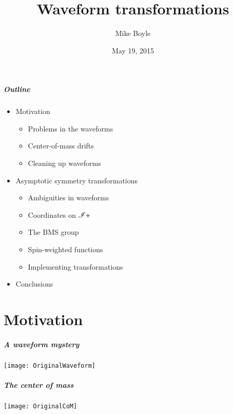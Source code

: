 \documentclass[12pt,xcolor={dvipsnames}]{beamer}
\title{Waveform transformations}
\author[Mike Boyle] {Mike Boyle}
\date{May 19, 2015}
\begin{document}
\begin{frame}[plain]
  \titlepage
\end{frame}



\begin{frame}
  \frametitle{Outline}
  \begin{itemize}
  \item Motivation
    \begin{itemize}
    \item Problems in the waveforms
    \item Center-of-mass drifts
    \item Cleaning up waveforms
    \end{itemize}
  \item Asymptotic symmetry transformations
    \begin{itemize}
    \item Ambiguities in waveforms
    \item Coordinates on $\mathscr{I}+$
    \item The BMS group
    \item Spin-weighted functions
    \item Implementing transformations
    \end{itemize}
  \item Conclusions
  \end{itemize}
\end{frame}



\part{Motivation}
\partpage


\begin{frame}
  \frametitle{A waveform mystery}
  \texttt{[image: OriginalWaveform]}
\end{frame}

\begin{frame}
  \frametitle{The center of mass}
  \texttt{[image: OriginalCoM]}
\end{frame}
\end{document}
